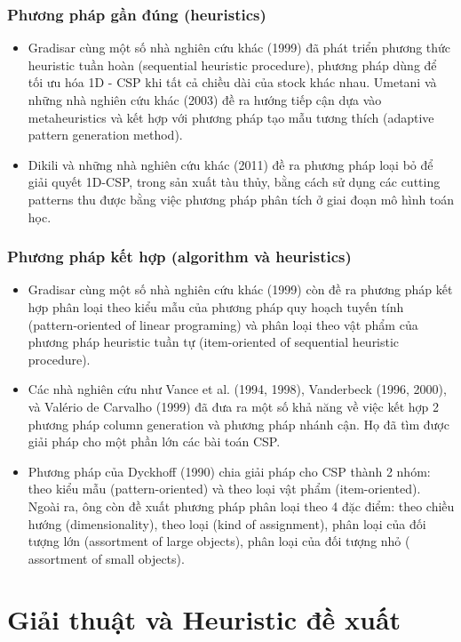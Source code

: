 \documentclass[a4paper]{article}
\begin{document}
\subsubsection{Phương pháp gần đúng (heuristics)}
\begin{itemize}[itemsep=1.5pt, parsep=1.5pt]
    \item Gradisar cùng một số nhà nghiên cứu khác (1999) đã phát triển phương thức heuristic tuần hoàn (sequential heuristic procedure), phương pháp dùng để tối ưu hóa 1D - CSP khi tất cả chiều dài của stock khác nhau. Umetani và những nhà nghiên cứu khác (2003) đề ra hướng tiếp cận dựa vào metaheuristics và kết hợp với phương pháp tạo mẫu tương thích (adaptive pattern generation method).
    \item Dikili và những nhà nghiên cứu khác (2011) đề ra phương pháp loại bỏ để giải quyết 1D-CSP, trong sản xuất tàu thủy, bằng cách sử dụng các cutting patterns thu được bằng việc phương pháp phân tích ở giai đoạn mô hình toán học.
\end{itemize}
\subsubsection{Phương pháp kết hợp (algorithm và heuristics)}
\begin{itemize}[itemsep=1.5pt, parsep=1.5pt]
    \item Gradisar cùng một số nhà nghiên cứu khác (1999) còn đề ra phương pháp kết hợp phân loại theo kiểu mẫu của phương pháp quy hoạch tuyến tính (pattern-oriented of linear programing) và phân loại theo vật phẩm của phương pháp heuristic tuần tự (item-oriented of sequential heuristic procedure). 
    \item Các nhà nghiên cứu như Vance et al. (1994, 1998), Vanderbeck (1996, 2000), và Valério de Carvalho (1999) đã đưa ra một số khả năng về việc kết hợp 2 phương pháp column generation và phương pháp nhánh cận. Họ đã tìm được giải pháp cho một phần lớn các bài toán CSP. 
    \item Phương pháp của Dyckhoff (1990) chia giải pháp cho CSP thành 2 nhóm: theo kiểu mẫu (pattern-oriented) và theo loại vật phẩm (item-oriented). Ngoài ra, ông còn đề xuất phương pháp phân loại theo 4 đặc điểm: theo chiều hướng (dimensionality), theo loại (kind of assignment), phân loại của đối tượng lớn (assortment of large objects), phân loại của đối tượng nhỏ ( assortment of small objects).
\end{itemize}
\section{Giải thuật và Heuristic đề xuất}
\end{document}
